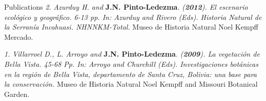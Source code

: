 \documentclass{resume} %
\begin{document}
\begin{rSection}{Publications}
{\em 2.} {\em Azurduy H. and} {\bf{J.N. Pinto-Ledezma}}. {\em ({{\bf 2012}}). El escenario ecológico y geográfico. 6-13 pp. In: Azurduy and Rivero (Eds). Historia Natural de la Serranía Incahuasi. NHNNKM-Total.} {Museo de Historia Natural Noel Kempff Mercado}.

{\em 1.} {\em Villarroel D., L. Arroyo and} {\bf{J.N. Pinto-Ledezma}}. {\em ({{\bf 2009}}). La vegetación de Bella Vista. 45-68 Pp. In: Arroyo and Churchill (Eds). Investigaciones botánicas en la región de Bella Vista, departamento de Santa Cruz, Bolivia: una base para la conservación.} {Museo de Historia Natural Noel Kempff and Missouri Botanical Garden}. 

\end{rSection}
\end{document}
